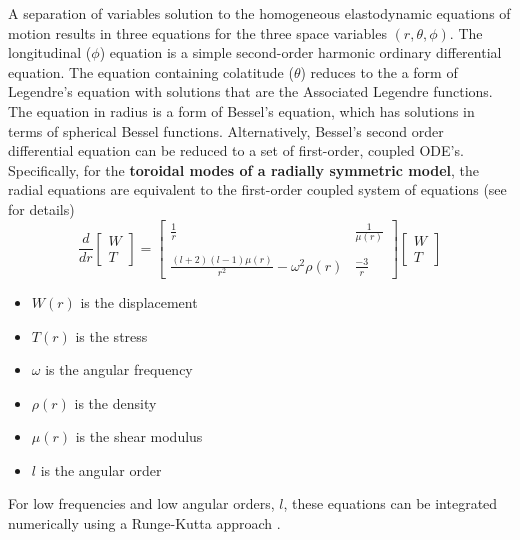 \documentclass[11pt,titlepage,fleqn]{article}
\begin{document}
A separation of variables solution to the homogeneous elastodynamic equations of motion results in three equations for the three space variables $(r, \theta, \phi)$. The longitudinal ($\phi$) equation is a simple second-order harmonic ordinary differential equation. The equation containing colatitude ($\theta$) reduces to the a form of Legendre's equation with solutions that are the Associated Legendre functions. The equation in radius is a form of Bessel's equation, which has solutions in terms of spherical Bessel functions. Alternatively, Bessel's second order differential equation can be reduced to a set of first-order, coupled ODE's. Specifically, for the {\bf toroidal modes of a radially symmetric model}, the radial equations are equivalent to the
first-order coupled system of equations (see  for details)
%
\begin{equation}
\frac{d}{dr}
\left[ \begin{array}{c} W \\ T \end{array} \right]
=
\left[ \begin{array}{cc}
\frac{1}{r} & \frac{1}{\mu(r)} \\
& \\
\frac{(l+2)(l-1)\mu(r)}{r^2}-\omega^2\rho(r) & \frac{-3}{r}
\end{array} \right]
\left[ \begin{array}{c} W \\ T \end{array} \right]
\label{ODEs}
\end{equation}
%
\begin{itemize}
\item $W(r)$ is the displacement
\item $T(r)$ is the stress
\item $\omega$ is the angular frequency
\item $\rho(r)$ is the density
\item $\mu(r)$ is the shear modulus
\item $l$ is the angular order
\end{itemize}
%
For low frequencies and low
angular orders,
$l$, these equations can be integrated numerically using a Runge-Kutta approach \citep[\eg][]{Press1988}.
\end{document}
